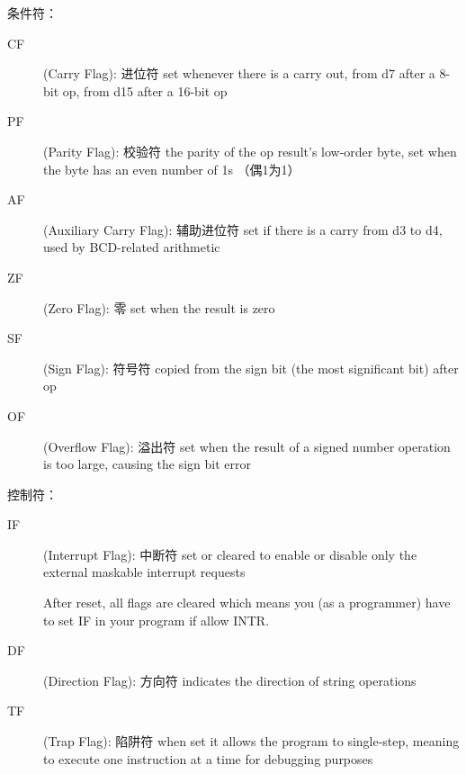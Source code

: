 条件符：
\begin{description}
	\item[CF](Carry Flag): 进位符 set whenever there is a carry out, from d7 after a 8-bit op, from d15 after a 16-bit op
	\item[PF](Parity Flag): 校验符 the parity of the op result’s low-order byte,  set when the byte has an even number of 1s （偶1为1）
	\item[AF](Auxiliary Carry Flag): 辅助进位符 set if there is a carry from d3 to d4, used by BCD-related arithmetic
	\item[ZF](Zero Flag): 零 set when the result is zero
	\item[SF](Sign Flag): 符号符 copied from the sign bit (the most significant bit) after op
	\item[OF](Overflow Flag): 溢出符 set when the result of a signed number operation is too large, causing the sign bit error
\end{description}
控制符：
\begin{description}
	\item[IF] (Interrupt Flag): 中断符 set or cleared to enable or disable only the external maskable interrupt requests
	\begin{tcolorbox}
		\scriptsize
		After reset, all flags are cleared which means you (as a programmer) have to set IF in your program if allow INTR.
	\end{tcolorbox}
	\item[DF] (Direction Flag): 方向符 indicates the direction of string operations
	\item[TF] (Trap Flag): 陷阱符 when set it allows the program to single-step, meaning to execute one instruction at a time for debugging purposes
\end{description}

